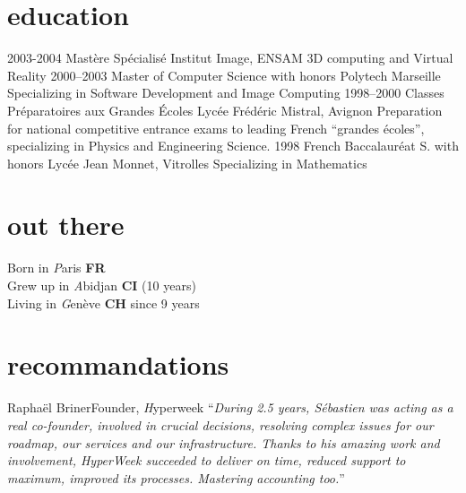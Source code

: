 \documentclass[]{friggeri}
\begin{document}
\section{education}

\begin{entrylist}
  \entry
    {2003-2004}
    {Mastère Spécialisé}
    {Institut Image, ENSAM}
    {3D computing and Virtual Reality}
  \entry
    {2000–2003}
    {Master of Computer Science with honors}
    {Polytech Marseille}
    {Specializing in Software Development and Image Computing}
  \entry
    {1998–2000}
    {Classes Préparatoires aux Grandes Écoles}
    {Lycée Frédéric Mistral, Avignon}
    {Preparation for national competitive entrance exams to leading French
    ``grandes écoles'', specializing in Physics and Engineering Science.}
  \entry
    {1998}
    {French Baccalauréat S. with honors}
    {Lycée Jean Monnet, Vitrolles}
    {Specializing in Mathematics}
\end{entrylist}

\section{out there}

{\FA \faMapPin} Born in {\emph Paris} {\bf FR}\\
{\FA \faPlane} Grew up in {\emph Abidjan} {\bf CI} (10 years)\\
{\FA \faPlane} Living in {\emph Genève} {\bf CH} since 9 years

\clearpage

\section{recommandations}

\begin{quoting}{Raphaël Briner}{Founder, {\emph Hyperweek}}
``\textit{During 2.5 years, Sébastien was acting as a real co-founder,
involved in crucial decisions, resolving complex issues for our roadmap, our
services and our infrastructure. Thanks to his amazing work and involvement,
HyperWeek succeeded to deliver on time, reduced support to maximum, improved
its processes. Mastering accounting too.}''
\end{quoting}
\end{document}
